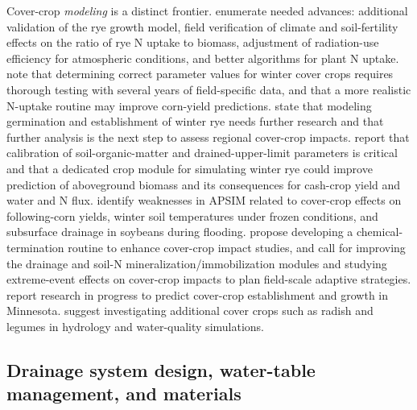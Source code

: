 Cover-crop \emph{modeling} is a distinct frontier. \textcite{Feyereisen2006} enumerate needed advances: additional validation of the rye growth model, field verification of climate and soil-fertility effects on the ratio of rye N uptake to biomass, adjustment of radiation-use efficiency for atmospheric conditions, and better algorithms for plant N uptake. \textcite{Malone2007c} note that determining correct parameter values for winter cover crops requires thorough testing with several years of field-specific data, and that a more realistic N-uptake routine may improve corn-yield predictions. \textcite{Malone2014b} state that modeling germination and establishment of winter rye needs further research and that further analysis is the next step to assess regional cover-crop impacts. \textcite{Chatterjee2025} report that calibration of soil-organic-matter and drained-upper-limit parameters is critical and that a dedicated crop module for simulating winter rye could improve prediction of aboveground biomass and its consequences for cash-crop yield and water and N flux. \textcite{Dietzel2016} identify weaknesses in APSIM related to cover-crop effects on following-corn yields, winter soil temperatures under frozen conditions, and subsurface drainage in soybeans during flooding. \textcite{Gupta2022} propose developing a chemical-termination routine to enhance cover-crop impact studies, and \textcite{Gupta2023b} call for improving the drainage and soil-N mineralization/immobilization modules and studying extreme-event effects on cover-crop impacts to plan field-scale adaptive strategies. \textcite{Strock2004} report research in progress to predict cover-crop establishment and growth in Minnesota. \textcite{Singh2023} suggest investigating additional cover crops such as radish and legumes in hydrology and water-quality simulations.

\subsection{Drainage system design, water-table management, and materials}

